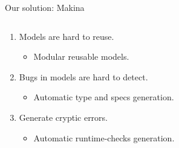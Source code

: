 \documentclass[aspectratio=169, 10pt]{beamer}
\begin{document}
\begin{frame}[label={sec:orgf78e59a}]{Our solution: Makina}
\begin{columns}
\begin{column}{0.48\columnwidth}
\begin{enumerate}
\item Models are hard to reuse.
\begin{itemize}
\item Modular reusable models. \vspace{10pt}
\end{itemize}
\item Bugs in models are hard to detect.
\begin{itemize}
\item Automatic type and specs generation. \vspace{10pt}
\end{itemize}
\item Generate cryptic errors.
\begin{itemize}
\item Automatic runtime-checks generation. \vspace{10pt}
\end{itemize}
\end{enumerate}
\end{column}
\end{columns}
\end{frame}
\end{document}
